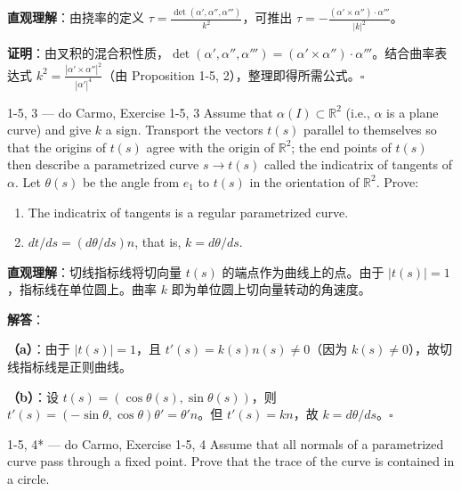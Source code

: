 \begin{solution}
\textbf{直观理解}：由挠率的定义 $\tau = \frac{\det(\alpha', \alpha'', \alpha''')}{k^2}$，可推出 $\tau = -\frac{(\alpha'\times\alpha'')\cdot\alpha'''}{|k|^2}$。

\textbf{证明}：由叉积的混合积性质，$\det(\alpha', \alpha'', \alpha''') = (\alpha'\times\alpha'')\cdot\alpha'''$。结合曲率表达式 $k^2 = \frac{|\alpha'\times\alpha''|^2}{|\alpha'|^4}$（由 Proposition 1-5, 2），整理即得所需公式。$\square$
\end{solution}

\begin{exercise}{1-5, 3 — do Carmo, Exercise 1-5, 3}
Assume that $\alpha(I) \subset \mathbb{R}^2$ (i.e., $\alpha$ is a plane curve) and give $k$ a sign. Transport the vectors $t(s)$ parallel to themselves so that the origins of $t(s)$ agree with the origin of $\mathbb{R}^2$; the end points of $t(s)$ then describe a parametrized curve $s \to t(s)$ called the indicatrix of tangents of $\alpha$. Let $\theta(s)$ be the angle from $e_1$ to $t(s)$ in the orientation of $\mathbb{R}^2$. Prove:
\begin{enumerate}
\item[a.] The indicatrix of tangents is a regular parametrized curve.
\item[b.] $dt/ds = (d\theta/ds)n$, that is, $k = d\theta/ds$.
\end{enumerate}
\end{exercise}

\begin{solution}
\textbf{直观理解}：切线指标线将切向量 $t(s)$ 的端点作为曲线上的点。由于 $|t(s)|=1$，指标线在单位圆上。曲率 $k$ 即为单位圆上切向量转动的角速度。

\textbf{解答}：

\textbf{（a）}：由于 $|t(s)|=1$，且 $t'(s) = k(s)n(s) \neq 0$（因为 $k(s) \neq 0$），故切线指标线是正则曲线。

\textbf{（b）}：设 $t(s) = (\cos\theta(s), \sin\theta(s))$，则 $t'(s) = (-\sin\theta, \cos\theta)\theta' = \theta'n$。但 $t'(s) = kn$，故 $k = d\theta/ds$。$\square$
\end{solution}

\begin{exercise}{1-5, 4* — do Carmo, Exercise 1-5, 4}
Assume that all normals of a parametrized curve pass through a fixed point. Prove that the trace of the curve is contained in a circle.
\end{exercise}

